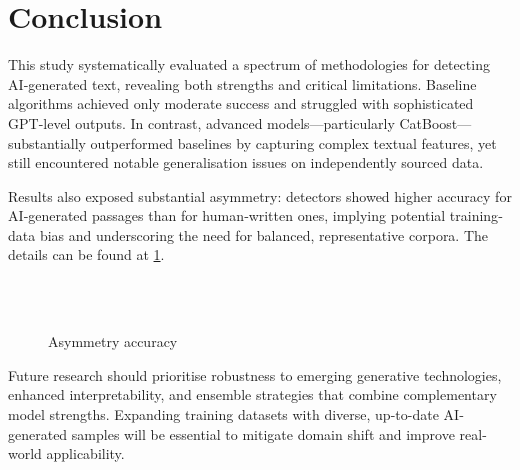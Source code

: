 
\section{Conclusion}  %

This study systematically evaluated a spectrum of methodologies for
detecting AI‐generated text, revealing both strengths and critical
limitations. Baseline algorithms achieved only moderate success and
struggled with sophisticated GPT-level outputs. In contrast, advanced
models—particularly CatBoost—substantially outperformed baselines by
capturing complex textual features, yet still encountered notable
generalisation issues on independently sourced data.

Results also exposed substantial asymmetry: detectors showed higher
accuracy for AI‐generated passages than for human‐written ones, implying
potential training‐data bias and underscoring the need for balanced,
representative corpora. The details can be found at \cref{fig:asymmetry}.

\begin{figure}[h!]
  \centering

  \\
  \\
  \caption{Asymmetry accuracy}
  \label{fig:asymmetry}
\end{figure}

Future research should prioritise robustness to emerging generative
technologies, enhanced interpretability, and ensemble strategies that
combine complementary model strengths. Expanding training datasets with
diverse, up-to-date AI‐generated samples will be essential to mitigate
domain shift and improve real-world applicability.
